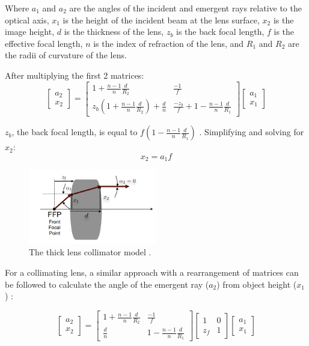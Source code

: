 Where $a_1$ and $a_2$ are the angles of the incident and emergent rays relative to the optical axis, $x_1$ is the height of the incident beam at the lens surface, $x_2$ is the image height, $d$ is the thickness of the lens, $z_b$ is the back focal length, $f$ is the effective focal length, $n$ is the index of refraction of the lens, and $R_1$ and $R_2$ are the radii of curvature of the lens. 

After multiplying the first 2 matrices:
\[ 
\begin{bmatrix} a_2\\x_2 \end{bmatrix} =
\begin{bmatrix}
1 + \frac{n-1}{n}\frac{d}{R_2} & \frac{-1}{f}\\
z_b\left(1 + \frac{n-1}{n}\frac{d}{R_2}\right) + \frac{d}{n} & \frac{-z_b}{f} + 1 - \frac{n-1}{n}\frac{d}{R_1}
\end{bmatrix}
\begin{bmatrix}
a_1\\
x_1
\end{bmatrix}
\]

$z_b$, the back focal length, is equal to $f\left(1 - \frac{n-1}{n}\frac{d}{R_1}\right)$ \cite{MIT_Lec5}. Simplifying and solving for $x_2$:
\begin{equation}
    \boxed{x_2 = a_1f}
\end{equation}

\begin{figure}[H]
\centering
\includegraphics[width=0.5\textwidth]{figures/thick-lens-collimator.png}
\caption{The thick lens collimator model \cite{MIT_Lec5}.}
\label{fig:thick-lens-collimator-model}
\end{figure}

For a collimating lens, a similar approach with a rearrangement of matrices can be followed to calculate the angle of the emergent ray ($a_2$) from object height ($x_1$) \cite{MIT_Lec4, MIT_Lec5}:

\[ 
\begin{bmatrix} a_2\\x_2 \end{bmatrix} =
\begin{bmatrix}
1 + \frac{n-1}{n} \frac{d}{R_2} & \frac{-1}{f}\\
\frac{d}{n} & 1 - \frac{n-1}{n} \frac{d}{R_1}
\end{bmatrix}
\begin{bmatrix}
1 & 0\\
z_f & 1
\end{bmatrix}
\begin{bmatrix}
a_1\\
x_1
\end{bmatrix}
\]

